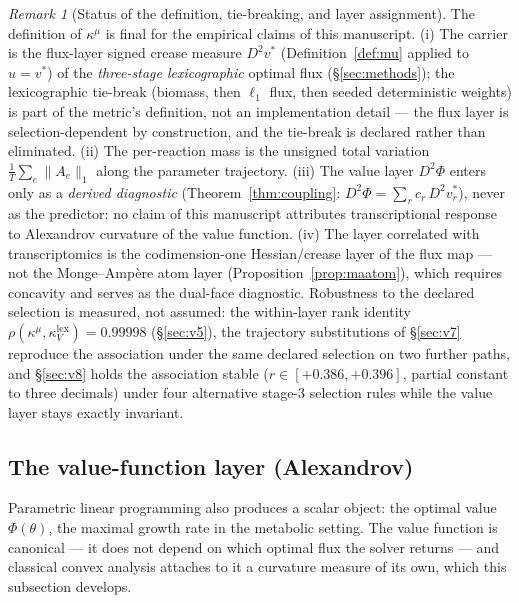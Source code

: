 \documentclass[11pt,a4paper]{article}
\theoremstyle{plain}
\theoremstyle{definition}
\theoremstyle{remark}
\newtheorem{remark}[theorem]{Remark}
\newcommand{\kk}{\kappa_{\!V}}
\newcommand{\kmu}{\kappa^{\mu}}
\begin{document}
\begin{remark}[Status of the definition, tie-breaking, and layer assignment]
\label{rem:lock}
The definition of $\kmu$ is final for the empirical claims of this
manuscript. (i) The carrier is the flux-layer signed crease measure
$D^2 v^*$ (Definition~\ref{def:mu} applied to $u = v^*$) of the
\emph{three-stage lexicographic} optimal flux (\S\ref{sec:methods});
the lexicographic tie-break (biomass, then $\ell_1$ flux, then seeded
deterministic weights) is part of the metric's definition, not an
implementation detail --- the flux layer is selection-dependent by
construction, and the tie-break is declared rather than eliminated.
(ii) The per-reaction mass is the unsigned total variation
$\frac{1}{T}\sum_e \|A_e\|_1$ along the parameter trajectory.
(iii) The value layer $D^2\Phi$ enters only as a \emph{derived
diagnostic} (Theorem~\ref{thm:coupling}:
$D^2\Phi = \sum_r c_r\, D^2 v^*_r$), never as the predictor: no claim
of this manuscript attributes transcriptional response to Alexandrov
curvature of the value function. (iv) The layer correlated with
transcriptomics is the codimension-one Hessian/crease layer of the
flux map --- not the Monge--Amp\`ere atom layer
(Proposition~\ref{prop:maatom}), which requires concavity and serves
as the dual-face diagnostic. Robustness to the declared selection is
measured, not assumed: the within-layer rank identity
$\rho(\kmu, \kk^{\mathrm{lex}}) = 0.99998$ (\S\ref{sec:v5}), the trajectory substitutions of \S\ref{sec:v7} reproduce the association under the same declared selection on two further paths, and \S\ref{sec:v8} holds the
association stable ($r \in [+0.386, +0.396]$, partial constant to
three decimals) under four alternative stage-3 selection rules while
the value layer stays exactly invariant.
\end{remark}

\subsection{The value-function layer (Alexandrov)}

Parametric linear programming also produces a scalar object: the
optimal value $\Phi(\theta)$, the maximal growth rate in the metabolic
setting. The value function is canonical --- it does not depend on
which optimal flux the solver returns --- and classical convex
analysis attaches to it a curvature measure of its own, which this
subsection develops.
\end{document}
